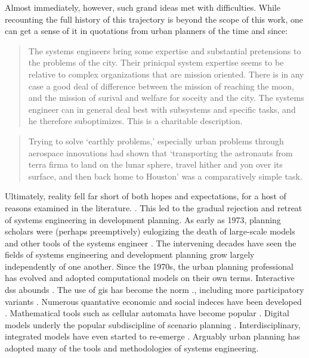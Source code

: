 \documentclass[notitlepage]{article}
\begin{document}
Almost immediately, however, such grand ideas met with difficulties. While recounting the full history of this trajectory is beyond the scope of this work, one can get a sense of it in quotations from urban planners of the time and since:

\blockquote{The systems engineers bring some expertise and substantial pretensions to the problems of the city. Their prinicpal system expertise seems to be relative to complex organizations that are mission oriented. There is in any case a good deal of difference between the mission of reaching the moon, and the mission of surival and welfare for soceity and the city. The systems engineer can in general deal best with subsystems and specific tasks, and he therefore suboptimizes. This is a charitable description. \cite{robinsonDecisionmakingUrbanPlanning1972}}

\blockquote{Trying to solve `earthly problems,' especially urban problems through aerospace innovations had shown that `transporting the astronauts from terra firma to land on the lunar sphere, travel hither and yon over its surface, and then back home to Houston' was a comparatively simple task. \cite{lightWarfareWelfareDefense2005}}

Ultimately, reality fell far short of both hopes and expectations, for a host of reasons examined in the literature. \cite{lightWarfareWelfareDefense2005, mazza2017, eubanksAutomatingInequalityHow2018, scottSeeingStateHow2020, mcloughlinSystemGuidanceControl1972, mcloughlinChartingPossibleCourses1972}. This led to the gradual rejection and retreat of systems engineering in development planning. As early as 1973, planning scholars were (perhaps preemptively) eulogizing the death of large-scale models and other tools of the systems engineer \cite{leejrRequiemLargeScaleModels1973}. The intervening decades have seen the fields of systems engineering and development planning grow largely independently of one another. Since the 1970s, the urban planning professional has evolved and adopted computational models on their own terms. Interactive \ac{dss} abounds \cite{waddellUrbanSimModelingUrban2002, walkerPlannersGuideCommunityViz2017}. The use of \ac{gis} has become the norm \cite{jankowskiGISGroupDecision2001,tomlinGISCartographicModeling2012,wilsonHandbookGeographicInformation2007}., including more participatory variants \cite{sieberPublicParticipationGeographic2006}. Numerous quantative economic and social indeces have been developed \cite{boyceFrameworkDefiningApplying1972, cliftonQuantitativeAnalysisUrban2008,readAssetbasedEconomicDevelopment2012,sawickiNeighborhoodIndicatorsReview1996,valRegionalLocalEconomic1991} . Mathematical tools such as cellular automata have become popular \cite{battyCitiesComplexity2005,laufUncoveringLanduseDynamics2012}. Digital models underly the popular subdiscipline of scenario planning \cite{goodspeedScenarioPlanningCities2020,zapataRadicalUncertaintyScenario2015}. Interdisciplinary, integrated models have even started to re-emerge \cite{millerIntegratedUrbanModeling2018,moeckelTrendsIntegratedLanduse2018,shahumyanIntegrationLandUse2017}. 
Arguably urban planning has adopted many of the tools and methodologies of systems engineering.
\end{document}
